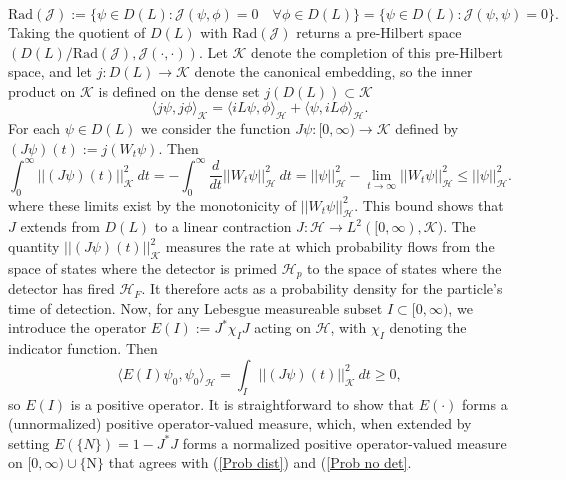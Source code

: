 \documentclass{article}
\numberwithin{equation}{section}
\begin{document}
\begin{equation}
    \text{Rad}(\mathcal{J}):=\{\psi \in D(L): \mathcal{J}(\psi,\phi)=0 \quad \forall \phi \in D(L) \}=\{\psi \in D(L): \mathcal{J}(\psi,\psi) =0\}.
\end{equation}
Taking the quotient of $D(L)$ with $\text{Rad}(\mathcal{J})$ returns a pre-Hilbert space $(D(L)/\text{Rad}(\mathcal{J}), \mathcal{J}(\cdot,\cdot))$. Let $\mathcal{K}$ denote the completion of this pre-Hilbert space, and let $j:D(L)\to \mathcal{K}$ denote the canonical embedding, so the inner product on $\mathcal{K}$ is defined on the dense set $j(D(L)) \subset \mathcal{K}$
\begin{equation}\label{Embedding In Prod}
    \langle j \psi,j\phi \rangle_{\mathcal{K}}=\langle iL \psi, \phi \rangle_{\mathcal{H}}+\langle \psi, iL \phi \rangle_{\mathcal{H}}.
\end{equation}
For each $\psi \in D(L)$ we consider the function $J\psi:[0,\infty) \to \mathcal{K}$ defined by $(J\psi)(t):=j(W_t\psi)$. Then
\begin{equation}
    \int_{0}^\infty ||(J \psi)(t) ||_{\mathcal{K}}^2 ~ dt=- \int_0^\infty \frac{d}{dt}||W_t \psi||_\mathcal{H}^2 ~dt=||\psi||_\mathcal{H}^2 - \lim_{t \to \infty}||W_t \psi||_{\mathcal{H}}^2 \leq ||\psi||_{\mathcal{H}}^2.
\end{equation}
where these limits exist by the monotonicity of $||W_t\psi||_{\mathcal{H}}^2$. This bound shows that $J$ extends from $D(L)$ to a linear contraction $J:\mathcal{H}\to L^2([0,\infty),\mathcal{K})$. The quantity $||(J\psi)(t)||_\mathcal{K}^2$ measures the rate at which probability flows from the space of states where the detector is primed $\mathcal{H}_p$ to the space of states where the detector has fired $\mathcal{H}_F$. It therefore acts as a probability density for the particle's time of detection. Now, for any Lebesgue measureable subset $I\subset [0,\infty)$, we introduce the operator $E(I):=J^*\chi_IJ$ acting on $\mathcal{H}$, with $\chi_I$ denoting the indicator function. Then
\begin{equation}
    \langle E(I)\psi_0,\psi_0\rangle_{\mathcal{H}}=\int_{I} ||(J\psi)(t)||_{\mathcal{K}}^2 ~dt \geq 0,
\end{equation}
so $E(I)$ is a positive operator. It is straightforward to show that $E(\cdot)$ forms a (unnormalized) positive operator-valued measure, which, when extended by setting $E(\{N\})=1-J^*J$ forms a normalized positive operator-valued measure on $[0,\infty)\cup \{\text{N}\}$ that agrees with (\ref{Prob dist}) and (\ref{Prob no det}. 
\end{document}
